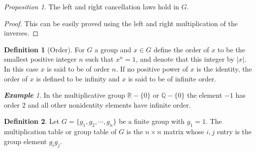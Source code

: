 \documentclass[paper=a4, fontsize=11pt]{scrartcl}
\numberwithin{equation}{section}		%
\numberwithin{figure}{section}			%
\numberwithin{table}{section}				%
\theoremstyle{definition}
\newtheorem{definition}{Definition}[section]
\theoremstyle{remark}
\theoremstyle{example}
\newtheorem{example}{\textbf{Example}}[section]
\newtheorem{prop}{Proposition}[section]
\begin{document}
\begin{prop}
    The left and right cancellation laws hold in $G$.
\end{prop}

\begin{proof}
    This can be easily proved using the left and right multiplication of the inverses.
\end{proof}

\begin{definition}[Order]
    For $G$ a group and $x \in G$ define the order of $x$ to be the smallest positive integer $n$ such that $x^n = 1$, and denote that this integer by $\lvert x \rvert$. In this case $x$ is said to be of order $n$. If no positive power of $x$ is the identity, the order of $x$ is defined to be infinity and $x$ is said to be of infinite order.
\end{definition}

\begin{example}
    In the multiplicative group $\mathbb{R} - \{0\}$ or $\mathbb{Q} - \{0\}$ the element $-1$ has order $2$ and all other nonidentity elements have infinite order.
\end{example}

\begin{definition}
    Let $G = \{g_1, g_2, \cdots, g_n\}$ be a finite group with $g_1 = 1$. The multiplication table or group table of $G$ is the $n \times n$ matrix whose $i,j$ entry is the group element $g_ig_j$.
\end{definition}


\newpage
\printbibliography
\end{document}
